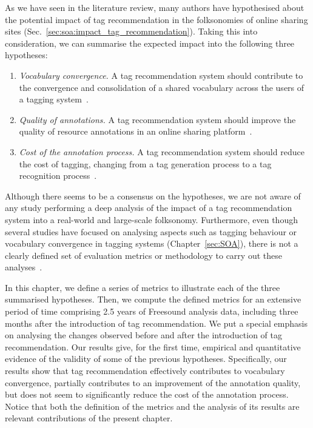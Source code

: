 As we have seen in the literature review, many authors have hypothesised about the potential impact of tag recommendation in the folksonomies of online sharing sites (Sec.~\ref{sec:soa:impact_tag_recommendation}). Taking this into consideration, we can summarise the expected impact into the following three hypotheses:
\begin{enumerate}
\item \textit{Vocabulary convergence.} A tag recommendation system should contribute to the convergence and consolidation of a shared vocabulary across the users of a tagging system~\citep{golder2006,marlow2006,jaske2007,Sood2007,Zangerle2011}.
\item \textit{Quality of annotations.} A tag recommendation system should improve the quality of resource annotations in an online sharing platform~\citep{Naaman2008,Jaschke2012,Wang2012}.
\item \textit{Cost of the annotation process.} A tag recommendation system should reduce the cost of tagging, changing from a tag generation process to a tag recognition process~\citep{Sood2007,jaske2007,Wang2012}.
\end{enumerate}

Although there seems to be a consensus on the hypotheses, we are not aware of any study performing a deep analysis of the impact of a tag recommendation system into a real-world and large-scale folksonomy. Furthermore, even though several studies have focused on analysing aspects such as tagging behaviour or vocabulary convergence in tagging systems (Chapter~\ref{sec:SOA}), there is not a clearly defined set of evaluation metrics or methodology to carry out these analyses~\citep{farooq2007}.

In this chapter, we define a series of metrics to illustrate each of the three summarised hypotheses. Then, we compute the defined metrics for an extensive period of time comprising 2.5 years of Freesound analysis data, including three months after the introduction of tag recommendation. We put a special emphasis on analysing the changes observed before and after the introduction of tag recommendation. Our results give, for the first time, empirical and quantitative evidence of the validity of some of the previous hypotheses.
Specifically, our results show that tag recommendation effectively contributes to vocabulary convergence, partially contributes to an improvement of the annotation quality, but does not seem to significantly reduce the cost of the annotation process. 
Notice that both the definition of the metrics and the analysis of its results are relevant contributions of the present chapter.


